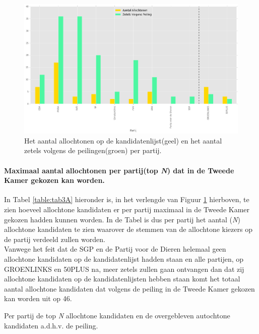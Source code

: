 \begin{figure}[H]

	\includegraphics[width=\linewidth]	{Aantal_allochtonen_aantal_zetels.png}

			\caption{Het aantal allochtonen op de kandidatenlijst(geel) en het aantal zetels volgens de peilingen(groen) per partij.}

\label{fig:zetelsA}
\end{figure}


\paragraph{Maximaal aantal allochtonen per partij(top \textit{N}) dat in de Tweede Kamer gekozen kan worden.}
In Tabel \ref{table:tab3A} hieronder is, in het verlengde van Figuur \ref{fig:zetelsA} hierboven, te zien hoeveel allochtone kandidaten er per partij maximaal in de Tweede Kamer gekozen hadden kunnen worden. In de Tabel is dus per partij het aantal (\textit{N}) allochtone kandidaten te zien waarover de stemmen van de allochtone kiezers op de partij verdeeld zullen worden.  
\\
\indent Vanwege het feit dat de SGP en de Partij voor de Dieren helemaal geen allochtone kandidaten op de kandidatenlijst hadden staan en alle partijen, op GROENLINKS en 50PLUS na, meer zetels zullen gaan ontvangen dan dat zij allochtone kandidaten op de kandidatenlijsten hebben staan komt het totaal aantal allochtone kandidaten dat volgens de peiling in de Tweede Kamer gekozen kan worden uit op 46. 





\begin{table}[H]
\centering
	\begin{footnotesize}
		
	\end{footnotesize}
			\caption{Per partij de top \textit{N} allochtone kandidaten en de overgebleven autochtone kandidaten a.d.h.v. de peiling.}
\label{table:tab3A} 
\end{table}



